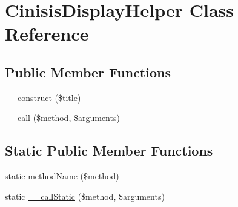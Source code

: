 \hypertarget{classCinisisDisplayHelper}{
\section{CinisisDisplayHelper Class Reference}
\label{classCinisisDisplayHelper}
}
\subsection*{Public Member Functions}
\begin{DoxyCompactItemize}
\item 
\hyperlink{classCinisisDisplayHelper_ae60a4cc7ad15109c83b3d934f89b283e}{\_\-\_\-construct} (\$title)
\item 
\hyperlink{classCinisisDisplayHelper_a5601da7181ece90313c1abe2fd0ae621}{\_\-\_\-call} (\$method, \$arguments)
\end{DoxyCompactItemize}
\subsection*{Static Public Member Functions}
\begin{DoxyCompactItemize}
\item 
static \hyperlink{classCinisisDisplayHelper_ab263cf81e5c459c60baa6ef7fa5f76b2}{methodName} (\$method)
\item 
static \hyperlink{classCinisisDisplayHelper_abae906d7606b7d76ef5ed754835ba7e2}{\_\-\_\-callStatic} (\$method, \$arguments)
\end{DoxyCompactItemize}
